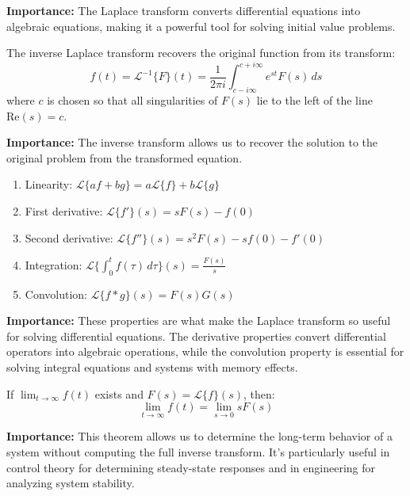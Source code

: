 \noindent\textbf{Importance:} The Laplace transform converts differential equations into algebraic equations, making it a powerful tool for solving initial value problems.

\begin{definition}
The inverse Laplace transform recovers the original function from its transform:
\[f(t) = \mathcal{L}^{-1}\{F\}(t) = \frac{1}{2\pi i} \int_{c-i\infty}^{c+i\infty} e^{st} F(s) \, ds\]
where $c$ is chosen so that all singularities of $F(s)$ lie to the left of the line $\text{Re}(s) = c$.
\end{definition}

\noindent\textbf{Importance:} The inverse transform allows us to recover the solution to the original problem from the transformed equation.

\begin{theorem}
\begin{enumerate}[label=(\alph*)]
\item Linearity: $\mathcal{L}\{af + bg\} = a\mathcal{L}\{f\} + b\mathcal{L}\{g\}$
\item First derivative: $\mathcal{L}\{f'\}(s) = sF(s) - f(0)$
\item Second derivative: $\mathcal{L}\{f''\}(s) = s^2F(s) - sf(0) - f'(0)$
\item Integration: $\mathcal{L}\{\int_0^t f(\tau) \, d\tau\}(s) = \frac{F(s)}{s}$
\item Convolution: $\mathcal{L}\{f * g\}(s) = F(s)G(s)$
\end{enumerate}
\end{theorem}

\noindent\textbf{Importance:} These properties are what make the Laplace transform so useful for solving differential equations. The derivative properties convert differential operators into algebraic operations, while the convolution property is essential for solving integral equations and systems with memory effects.



\begin{theorem}
If $\lim_{t \to \infty} f(t)$ exists and $F(s) = \mathcal{L}\{f\}(s)$, then:
\[\lim_{t \to \infty} f(t) = \lim_{s \to 0} sF(s)\]
\end{theorem}

\noindent\textbf{Importance:} This theorem allows us to determine the long-term behavior of a system without computing the full inverse transform. It's particularly useful in control theory for determining steady-state responses and in engineering for analyzing system stability.





